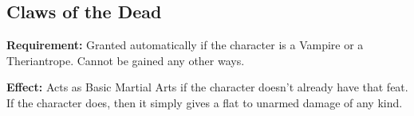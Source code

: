 \subsection{Claws of the Dead}
\begin{table}[!ht]
\centering
{}
\end{table}
\textbf{Requirement:} Granted automatically if the character is a Vampire or  a Theriantrope. Cannot be gained any other ways.

\textbf{Effect:} Acts as Basic Martial Arts if the character doesn't already have that feat. If the character does, then it simply gives a flat  to unarmed damage of any kind.

\newpage
